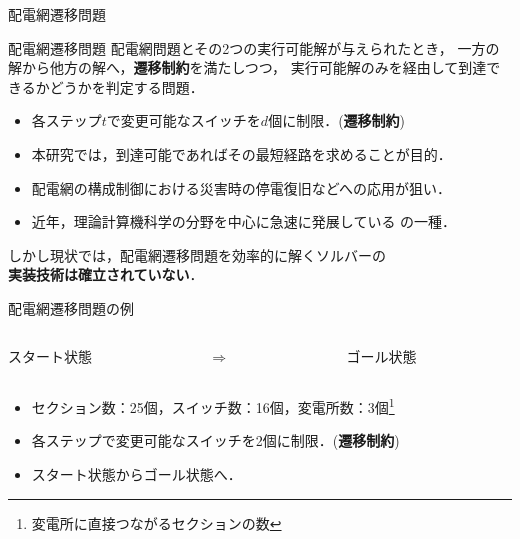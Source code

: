 \documentclass[dvipdfmx,11pt]{beamer}
\begin{document}
\begin{frame}{配電網遷移問題}
 \begin{alertblock}{配電網遷移問題}
  配電網問題とその2つの実行可能解が与えられたとき，
  一方の解から他方の解へ，\alert{\bf 遷移制約}を満たしつつ，
  実行可能解のみを経由して到達できるかどうかを判定する問題．
  \begin{itemize}
  \item 各ステップ$t$で変更可能なスイッチを$d$個に制限．(\textbf{遷移制約})
  \item 本研究では，到達可能であればその最短経路を求めることが目的．
  \end{itemize}
 \end{alertblock}
 \begin{itemize}
  \item 配電網の構成制御における災害時の停電復旧などへの応用が狙い．
  \item 近年，理論計算機科学の分野を中心に急速に発展している
        の一種．
 \end{itemize}
 \begin{alertblock}{}\centering
  しかし現状では，配電網遷移問題を効率的に解くソルバーの \\
  \alert{\bf 実装技術は確立されていない}．
 \end{alertblock}
\end{frame}
\begin{frame}{配電網遷移問題の例}
  \renewcommand{\thefootnote}{\fnsymbol{footnote}}
  \setcounter{footnote}{1}
  \begin{columns}
    \begin{column}{0.45\textwidth}\centering
      \begin{exampleblock}{スタート状態}
    \centering
    \scalebox{0.35}{}
      \end{exampleblock}
    \end{column}
    \begin{column}{0.05\textwidth}\centering
      $\Rightarrow$
    \end{column}
    \begin{column}{0.45\textwidth}\centering
      \begin{exampleblock}{ゴール状態}
        \centering
        \scalebox{0.35}{}
      \end{exampleblock}
    \end{column}
  \end{columns}
 \vfill
 \begin{itemize}
  \item セクション数：25個，スイッチ数：16個，変電所数：3個\footnote{%
        変電所に直接つながるセクションの数}%
  \item 各ステップで変更可能なスイッチを2個に制限．(\textbf{遷移制約})
  \item スタート状態からゴール状態へ．
 \end{itemize}
\end{frame}
\end{document}
